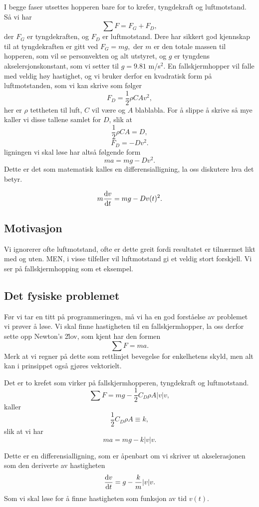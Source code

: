 \documentclass[a4paper, 11pt, notitlepage, english]{article}
\renewcommand{\d}{{\rm d}}
\begin{document}
I begge faser utsettes hopperen bare for to krefer, tyngdekraft og luftmotstand. Så vi har
$$\sum F = F_G + F_D,$$
der $F_G$ er tyngdekraften, og $F_D$ er luftmotstand. Dere har sikkert god kjennskap til at tyngdekraften er gitt ved
$F_G = mg,$
der $m$ er den totale massen til hopperen, som vil se personvekten og alt utstyret, og $g$ er tyngdens akselersjonskonstant, som vi setter til $g=9.81$ m/s$^2$. En fallskjermhopper vil falle med veldig høy hastighet, og vi bruker derfor en kvadratisk form på luftmotstanden, som vi kan skrive som følger
$$F_D = \frac{1}{2}\rho C A v^2,$$
her er $\rho$ tettheten til luft, $C$ vil være og $A$ blablabla. For å slippe å skrive så mye kaller vi disse tallene samlet for $D$, slik at
$$\frac{1}{2}\rho C A = D,$$
$$F_D = -Dv^2.$$
ligningen vi skal løse har altså følgende form
$$ma = mg - D v^2.$$
Dette er det som matematisk kalles en differensialligning, la oss diskutere hva det betyr.


$$m\frac{\d v}{\d t} = mg - D v(t)^2.$$

\subsection{Motivasjon}
Vi ignorerer ofte luftmotstand, ofte er dette greit fordi resultatet er tilnærmet likt med og uten. MEN, i visse tilfeller vil luftmotstand gi et veldig stort forskjell. Vi ser på fallskjermhopping som et eksempel.

\subsection*{Det fysiske problemet}
Før vi tar en titt på programmeringen, må vi ha en god forståelse av problemet vi prøver å løse. Vi skal finne hastigheten til en fallskjermhopper, la oss derfor sette opp Newton's 2\. lov, som kjent har den formen
$$\sum F = ma.$$
Merk at vi regner på dette som rettlinjet bevegelse for enkelhetens skyld, men alt kan i prinsippet også gjøres vektorielt.

Det er to krefet som virker på fallskjermhopperen, tyngdekraft og luftmotstand.
$$\sum F = mg - \frac{1}{2}C_D \rho A |v| v,$$
kaller
$$\frac{1}{2}C_D \rho A \equiv k,$$
slik at vi har
$$ma = mg - k|v|v.$$

Dette er en differensialligning, som er åpenbart om vi skriver ut akselerasjonen som den deriverte av hastigheten
$$\frac{\d v}{\d t} = g - \frac{k}{m}|v|v.$$
Som vi skal løse for å finne hastigheten som funksjon av tid $v(t)$.
\end{document}
